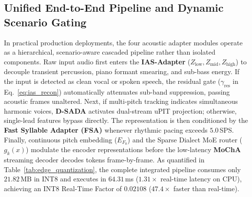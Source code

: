 \subsection{Unified End-to-End Pipeline and Dynamic Scenario Gating}
In practical production deployments, the four acoustic adapter modules operate as a hierarchical, scenario-aware cascaded pipeline rather than isolated components. Raw input audio first enters the \textbf{IAS-Adapter} ($Z_{\text{low}}, Z_{\text{mid}}, Z_{\text{high}}$) to decouple transient percussion, piano formant smearing, and sub-bass energy. If the input is detected as clean vocal or spoken speech, the residual gate ($\gamma_{\text{res}}$ in Eq.~\ref{eq:ias_recon}) automatically attenuates sub-band suppression, passing acoustic frames unaltered. Next, if multi-pitch tracking indicates simultaneous harmonic voices, \textbf{D-SADA} activates dual-stream uPIT projection; otherwise, single-lead features bypass directly. The representation is then conditioned by the \textbf{Fast Syllable Adapter (FSA)} whenever rhythmic pacing exceeds $5.0$\,SPS. Finally, continuous pitch embedding ($E_{F_0}$) and the Sparse Dialect MoE router ($g_k(x)$) modulate the encoder representations before the low-latency \textbf{MoChA} streaming decoder decodes tokens frame-by-frame. As quantified in Table~\ref{tab:edge_quantization}, the complete integrated pipeline consumes only $21.82$\,MB in INT8 and executes in $64.31$\,ms ($1.31\times$ real-time latency on CPU), achieving an INT8 Real-Time Factor of $0.02108$ ($47.4\times$ faster than real-time).

